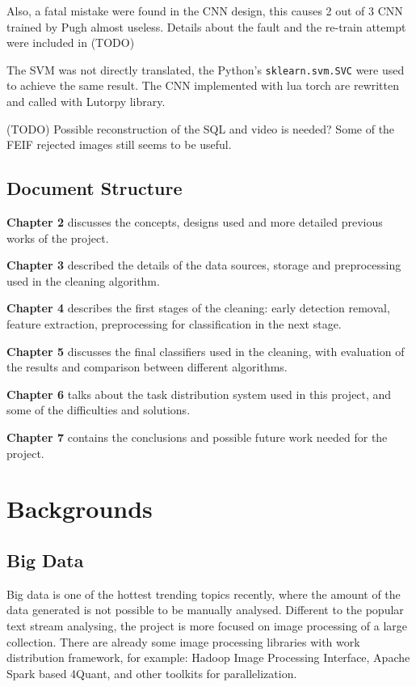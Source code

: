 \documentclass[bsc,logo,twoside,fullspacing,parskip]{infthesis}
\begin{document}
Also, a fatal mistake were found in the CNN design, this causes 2 out of 3 CNN trained by Pugh almost useless. Details about the fault and the re-train attempt were included in (TODO)

The SVM was not directly translated, the Python's {\tt sklearn.svm.SVC} were used to achieve the same result. The CNN implemented with lua torch are rewritten and called with Lutorpy library.

(TODO) Possible reconstruction of the SQL and video is needed? Some of the FEIF rejected images still seems to be useful.

\section{Document Structure}

\textbf{Chapter 2} discusses the concepts, designs used and more detailed previous works of the project. 

\textbf{Chapter 3} described the details of the data sources, storage and preprocessing used in the cleaning algorithm.

\textbf{Chapter 4} describes the first stages of the cleaning: early detection removal, feature extraction, preprocessing for classification in the next stage.

\textbf{Chapter 5} discusses the final classifiers used in the cleaning, with evaluation of the results and comparison between different algorithms. 

\textbf{Chapter 6} talks about the task distribution system used in this project, and some of the difficulties and solutions.

\textbf{Chapter 7} contains the conclusions and possible future work needed for the project.
\newpage

\chapter{Backgrounds}

\section{Big Data}

Big data is one of the hottest trending topics recently, where the amount of the data generated is not possible to be manually analysed. 
Different to the popular text stream analysing, the project is more focused on image processing of a large collection. 
There are already some image processing libraries with work distribution framework, for example: Hadoop Image Processing Interface\cite{L3}, Apache Spark based 4Quant\cite{L4}, and other toolkits for parallelization.
\end{document}
